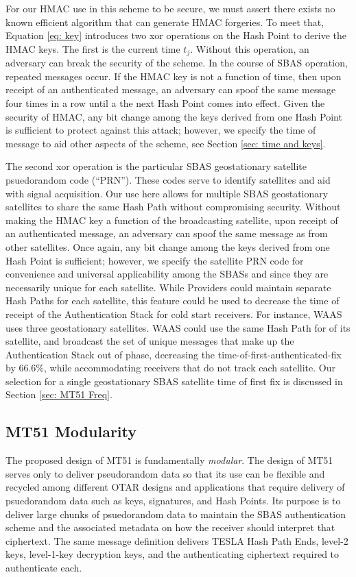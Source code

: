 \documentclass[letterpaper,times]{IONconf/IONconf}
\begin{document}
For our HMAC use in this scheme to be secure, we must assert there exists no known efficient algorithm that can generate HMAC forgeries.
To meet that, Equation \ref{eq: key} introduces two xor operations on the Hash Point to derive the HMAC keys.
The first is the current time $t_j$.
Without this operation, an adversary can break the security of the scheme.
In the course of SBAS operation, repeated messages occur.
If the HMAC key is not a function of time, then upon receipt of an authenticated message, an adversary can spoof the same message four times in a row until a the next Hash Point comes into effect.
Given the security of HMAC, any bit change among the keys derived from one Hash Point is sufficient to protect against this attack; however, we specify the time of message to aid other aspects of the scheme, see Section \ref{sec: time and keys}.

The second xor operation is the particular SBAS geostationary satellite psuedorandom code (``PRN'').
These codes serve to identify satellites and aid with signal acquisition.
Our use here allows for multiple SBAS geostationary satellites to share the same Hash Path without compromising security.
Without making the HMAC key a function of the broadcasting satellite, upon receipt of an authenticated message, an adversary can spoof the same message as from other satellites.
Once again, any bit change among the keys derived from one Hash Point is sufficient; however, we specify the satellite PRN code for convenience and universal applicability among the SBASs and since they are necessarily unique for each satellite.
While Providers could maintain separate Hash Paths for each satellite, this feature could be used to decrease the time of receipt of the Authentication Stack for cold start receivers.
For instance, WAAS uses three geostationary satellites.
WAAS could use the same Hash Path for of its satellite, and broadcast the set of unique messages that make up the Authentication Stack out of phase, decreasing the time-of-first-authenticated-fix by 66.6\%, while accommodating receivers that do not track each satellite.
Our selection for a single geostationary SBAS satellite time of first fix is discussed in Section \ref{sec: MT51 Freq}.

\subsection{MT51 Modularity} \label{sec: MT51 modularity}

The proposed design of MT51 is fundamentally {\em modular}.
The design of MT51 serves only to deliver pseudorandom data so that its use can be flexible and recycled among different OTAR designs and applications that require delivery of psuedorandom data such as keys, signatures, and Hash Points. 
Its purpose is to deliver large chunks of psuedorandom data to maintain the SBAS authentication scheme and the associated metadata on how the receiver should interpret that ciphertext.
The same message definition delivers TESLA Hash Path Ends, level-2 keys, level-1-key decryption keys, and the authenticating ciphertext required to authenticate each.
\end{document}
